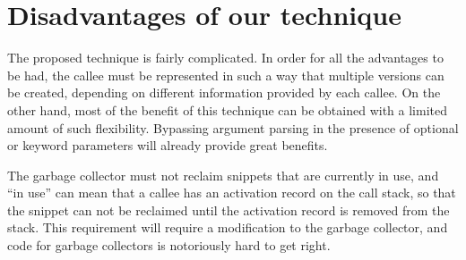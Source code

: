 \section{Disadvantages of our technique}

The proposed technique is fairly complicated.  In order for all the
advantages to be had, the callee must be represented in such a way
that multiple versions can be created, depending on different
information provided by each callee.  On the other hand, most of the
benefit of this technique can be obtained with a limited amount of
such flexibility.  Bypassing argument parsing in the presence of
optional or keyword parameters will already provide great benefits.

The garbage collector must not reclaim snippets that are currently in
use, and ``in use'' can mean that a callee has an activation record on
the call stack, so that the snippet can not be reclaimed until the
activation record is removed from the stack.  This requirement will
require a modification to the garbage collector, and code for garbage
collectors is notoriously hard to get right.
